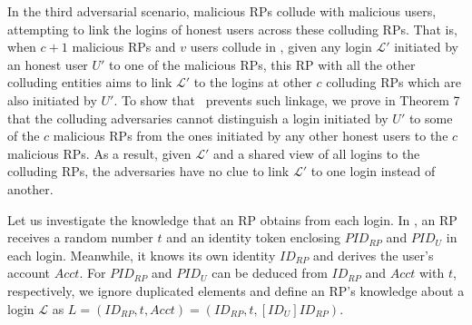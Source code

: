 


\vspace{2mm}

In the third adversarial scenario, malicious RPs collude with malicious users, attempting to link the logins of honest users across these colluding RPs.
That is, when $c+1$ malicious RPs and $v$ users collude in \usso, 
    given any login $\mathcal{L'}$ initiated by an honest user $U'$ to one of the malicious RPs,
    this RP with all the other colluding entities aims to link $\mathcal{L'}$ to the logins at other $c$ colluding RPs
     which are also initiated by $U'$.
To show that \usso~prevents such linkage, we prove in Theorem 7 that the colluding adversaries cannot distinguish a login initiated by $U'$ to some of the $c$ malicious RPs from the ones initiated by any other honest users to the $c$ malicious RPs.
As a result, given $\mathcal{L'}$ and a shared view of all logins to the colluding RPs, the adversaries have no clue to link $\mathcal{L'}$ to one login instead of another.

Let us investigate the knowledge that an RP obtains from each login. In \usso, an RP receives a random number $t$ and an identity token enclosing $PID_{RP}$ and $PID_U$ in each login. Meanwhile, it knows its own identity $ID_{RP}$ and derives the user's account $Acct$.
For $PID_{RP}$ and $PID_U$ can be deduced from $ID_{RP}$ and $Acct$ with $t$, respectively, we ignore duplicated elements and define an RP's knowledge about a login $\mathcal{L}$ as $L=(ID_{RP}, t, Acct)=(ID_{RP}, t, [ID_{U}]ID_{RP})$. %

